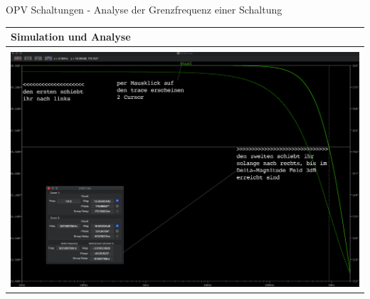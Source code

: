          \begin{frame}[t]{OPV Schaltungen - Analyse der Grenzfrequenz einer Schaltung }
    
          \begin{spacing}{0.9} \begin{tiny}
            \begin{table}[h!]
            \begin{tabular}{p{10cm}}
              \hline
              \textbf{Simulation und Analyse} \\
              \hline \\
              \begin{minipage}{\textwidth}
                \includegraphics[width=\linewidth]{pictures/bode_1_remastered.png}
              \end{minipage} 
              \\
            \end{tabular}
  
          \end{table}
           
          \end{tiny} \end{spacing}
   
                      
          
           \end{frame}


